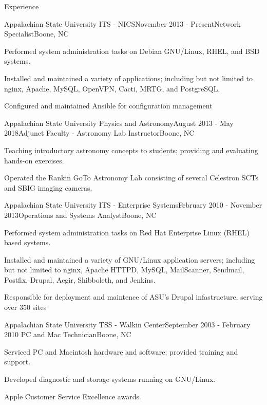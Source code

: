 \documentclass{cv} %
\begin{document}
\begin{rSection}{Experience}

\begin{rSubsection}{Appalachian State University ITS - NICS}{November 2013 - Present}{Network Specialist}{Boone, NC}
\item Performed system administration tasks on Debian GNU/Linux, RHEL, and BSD systems.
\item Installed and maintained a variety of applications; including but not limited to nginx, Apache, MySQL, OpenVPN, Cacti, MRTG, and PostgreSQL.
\item Configured and maintained Ansible for configuration management
\end{rSubsection}

\begin{rSubsection}{Appalachian State University Physics and Astronomy}{August 2013 - May 2018}{Adjunct Faculty - Astronomy Lab Instructor}{Boone, NC}
\item Teaching introductory astronomy concepts to students; providing and evaluating hands-on exercises.
\item Operated the Rankin GoTo Astronomy Lab consisting of several Celestron SCTs and SBIG imaging cameras.
\end{rSubsection}

\begin{rSubsection}{Appalachian State University ITS - Enterprise Systems}{February 2010 - November 2013}{Operations and Systems Analyst}{Boone, NC}
\item Performed system administration tasks on Red Hat Enterprise Linux (RHEL) based systems.
\item Installed and maintained a variety of GNU/Linux application servers; including but not limited to nginx, Apache HTTPD, MySQL, MailScanner, Sendmail, Postfix, Drupal, Aegir, Shibboleth, and Jenkins.
\item Responsible for deployment and maintence of ASU's Drupal infastructure, serving over 350 sites
\end{rSubsection}

\begin{rSubsection}{Appalachian State University TSS - Walkin Center}{September 2003 - February 2010
}{PC and Mac Technician}{Boone, NC}
\item Serviced PC and Macintosh hardware and software; provided training and support.
\item Developed diagnostic and storage systems running on GNU/Linux.
\item Apple Customer Service Excellence awards.
\end{rSubsection}


\end{rSection}
\end{document}
